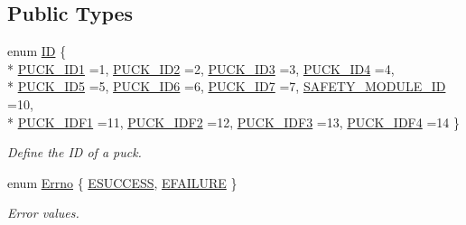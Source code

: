 \subsection*{Public Types}
\begin{DoxyCompactItemize}
\item 
enum \hyperlink{classosa_puck_aa484456bae759574accdc76fe68b4685}{I\-D} \{ \\*
\hyperlink{classosa_puck_aa484456bae759574accdc76fe68b4685a8f6224a7cf8c82077418223f0f635fbe}{P\-U\-C\-K\-\_\-\-I\-D1} =1, 
\hyperlink{classosa_puck_aa484456bae759574accdc76fe68b4685a725a6e6cc48834d9aad9d0e43ffbabc4}{P\-U\-C\-K\-\_\-\-I\-D2} =2, 
\hyperlink{classosa_puck_aa484456bae759574accdc76fe68b4685a0e01adbd2835c2bd1fb1d7395593a077}{P\-U\-C\-K\-\_\-\-I\-D3} =3, 
\hyperlink{classosa_puck_aa484456bae759574accdc76fe68b4685aed38def6a79f0b5627e3ba55d5eddc88}{P\-U\-C\-K\-\_\-\-I\-D4} =4, 
\\*
\hyperlink{classosa_puck_aa484456bae759574accdc76fe68b4685a9d7b99532e56f84db4fdea36c5825e88}{P\-U\-C\-K\-\_\-\-I\-D5} =5, 
\hyperlink{classosa_puck_aa484456bae759574accdc76fe68b4685adcc929e6040bbb5156ef09189361219e}{P\-U\-C\-K\-\_\-\-I\-D6} =6, 
\hyperlink{classosa_puck_aa484456bae759574accdc76fe68b4685acedb32b36ebd2c1b8eb19c6a9d511c61}{P\-U\-C\-K\-\_\-\-I\-D7} =7, 
\hyperlink{classosa_puck_aa484456bae759574accdc76fe68b4685aab1b8f9724a4be829e5cedf6307e733d}{S\-A\-F\-E\-T\-Y\-\_\-\-M\-O\-D\-U\-L\-E\-\_\-\-I\-D} =10, 
\\*
\hyperlink{classosa_puck_aa484456bae759574accdc76fe68b4685a74fa07d4ee93388f1cac5a6ea07bc13e}{P\-U\-C\-K\-\_\-\-I\-D\-F1} =11, 
\hyperlink{classosa_puck_aa484456bae759574accdc76fe68b4685aea968db3dd8a9bfde1940beff8b17626}{P\-U\-C\-K\-\_\-\-I\-D\-F2} =12, 
\hyperlink{classosa_puck_aa484456bae759574accdc76fe68b4685a3ae0bcf36626f7e051f07788baed4d6a}{P\-U\-C\-K\-\_\-\-I\-D\-F3} =13, 
\hyperlink{classosa_puck_aa484456bae759574accdc76fe68b4685a091148321429c37e4f3e7446d2797c03}{P\-U\-C\-K\-\_\-\-I\-D\-F4} =14
 \}
\begin{DoxyCompactList}\small\item\em Define the I\-D of a puck. \end{DoxyCompactList}\item 
enum \hyperlink{classosa_puck_af19c88d20083577d3a676353b4902391}{Errno} \{ \hyperlink{classosa_puck_af19c88d20083577d3a676353b4902391ade248d33c01e1fb3444c3aa6d9e6c1ae}{E\-S\-U\-C\-C\-E\-S\-S}, 
\hyperlink{classosa_puck_af19c88d20083577d3a676353b4902391a5aff629d7cc5592d2c7a94b756f6a741}{E\-F\-A\-I\-L\-U\-R\-E}
 \}
\begin{DoxyCompactList}\small\item\em Error values. \end{DoxyCompactList}\end{DoxyCompactItemize}

